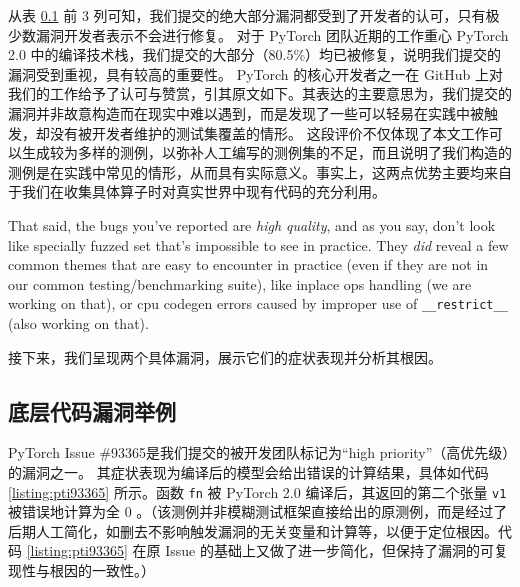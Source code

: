 从表 \ref{} 前 3 列可知，我们提交的绝大部分漏洞都受到了开发者的认可，只有极少数漏洞开发者表示不会进行修复。
对于 PyTorch 团队近期的工作重心 PyTorch 2.0 中的编译技术栈，我们提交的大部分（80.5\%）均已被修复，说明我们提交的漏洞受到重视，具有较高的重要性。
PyTorch 的核心开发者之一在 GitHub 上对我们的工作给予了认可与赞赏，引其原文\cite{ngimel_comments}如下。其表达的主要意思为，我们提交的漏洞并非故意构造而在现实中难以遇到，而是发现了一些可以轻易在实践中被触发，却没有被开发者维护的测试集覆盖的情形。
这段评价不仅体现了本文工作可以生成较为多样的测例，以弥补人工编写的测例集的不足，而且说明了我们构造的测例是在实践中常见的情形，从而具有实际意义。事实上，这两点优势主要均来自于我们在收集具体算子时对真实世界中现有代码的充分利用。

\begin{shadequote}
\small
That said, the bugs you've reported are \textit{high quality}, and as you say, don't look like specially fuzzed set that's impossible to see in practice. They \textit{did} reveal a few common themes that are easy to encounter in practice (even if they are not in our common testing/benchmarking suite), like inplace ops handling (we are working on that), or cpu codegen errors caused by improper use of \texttt{\_\_restrict\_\_} (also working on that).
\end{shadequote}

接下来，我们呈现两个具体漏洞，展示它们的症状表现并分析其根因。

\subsection{底层代码漏洞举例}

PyTorch Issue \#93365\cite{pti93365}是我们提交的被开发团队标记为“high priority”（高优先级）的漏洞之一。
其症状表现为编译后的模型会给出错误的计算结果，具体如代码 \ref{listing:pti93365} 所示。函数 \texttt{fn} 被 PyTorch 2.0 编译后，其返回的第二个张量 \texttt{v1} 被错误地计算为全 0 。（该测例并非模糊测试框架直接给出的原测例，而是经过了后期人工简化，如删去不影响触发漏洞的无关变量和计算等，以便于定位根因。代码 \ref{listing:pti93365} 在原 Issue 的基础上又做了进一步简化，但保持了漏洞的可复现性与根因的一致性。）

